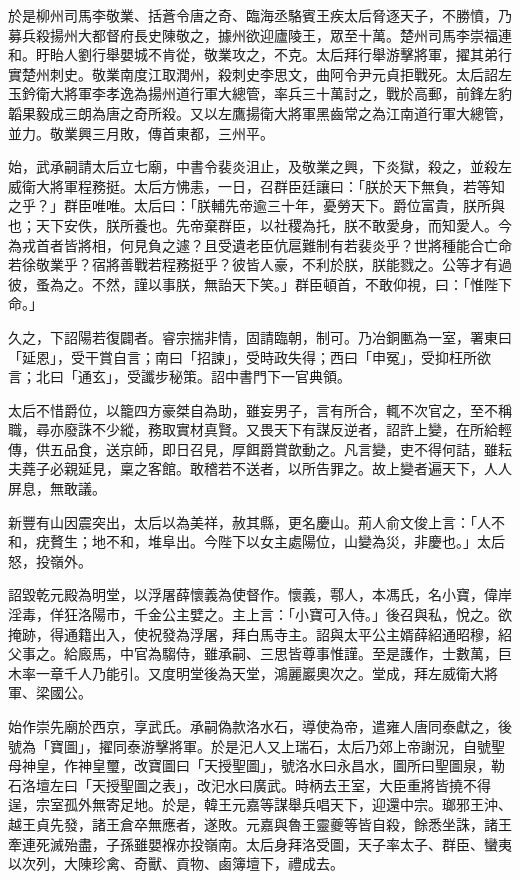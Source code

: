\begin{pinyinscope}
 於是柳州司馬李敬業、括蒼令唐之奇、臨海丞駱賓王疾太后脅逐天子，不勝憤，乃募兵殺揚州大都督府長史陳敬之，據州欲迎廬陵王，眾至十萬。楚州司馬李崇福連和。盱眙人劉行舉嬰城不肯從，敬業攻之，不克。太后拜行舉游擊將軍，擢其弟行實楚州刺史。敬業南度江取潤州，殺刺史李思文，曲阿令尹元貞拒戰死。太后詔左玉鈐衛大將軍李孝逸為揚州道行軍大總管，率兵三十萬討之，戰於高郵，前鋒左豹韜果毅成三朗為唐之奇所殺。又以左鷹揚衛大將軍黑齒常之為江南道行軍大總管，並力。敬業興三月敗，傳首東都，三州平。



 始，武承嗣請太后立七廟，中書令裴炎沮止，及敬業之興，下炎獄，殺之，並殺左威衛大將軍程務挺。太后方怫恚，一日，召群臣廷讓曰：「朕於天下無負，若等知之乎？」群臣唯唯。太后曰：「朕輔先帝逾三十年，憂勞天下。爵位富貴，朕所與也；天下安佚，朕所養也。先帝棄群臣，以社稷為托，朕不敢愛身，而知愛人。今為戎首者皆將相，何見負之遽？且受遺老臣伉扈難制有若裴炎乎？世將種能合亡命若徐敬業乎？宿將善戰若程務挺乎？彼皆人豪，不利於朕，朕能戮之。公等才有過彼，蚤為之。不然，謹以事朕，無詒天下笑。」群臣頓首，不敢仰視，曰：「惟陛下命。」



 久之，下詔陽若復闢者。睿宗揣非情，固請臨朝，制可。乃冶銅匭為一室，署東曰「延恩」，受干賞自言；南曰「招諫」，受時政失得；西曰「申冤」，受抑枉所欲言；北曰「通玄」，受讖步秘策。詔中書門下一官典領。



 太后不惜爵位，以籠四方豪桀自為助，雖妄男子，言有所合，輒不次官之，至不稱職，尋亦廢誅不少縱，務取實材真賢。又畏天下有謀反逆者，詔許上變，在所給輕傳，供五品食，送京師，即日召見，厚餌爵賞歆動之。凡言變，吏不得何詰，雖耘夫蕘子必親延見，稟之客館。敢稽若不送者，以所告罪之。故上變者遍天下，人人屏息，無敢議。



 新豐有山因震突出，太后以為美祥，赦其縣，更名慶山。荊人俞文俊上言：「人不和，疣贅生；地不和，堆阜出。今陛下以女主處陽位，山變為災，非慶也。」太后怒，投嶺外。



 詔毀乾元殿為明堂，以浮屠薛懷義為使督作。懷義，鄠人，本馮氏，名小寶，偉岸淫毒，佯狂洛陽市，千金公主嬖之。主上言：「小寶可入侍。」後召與私，悅之。欲掩跡，得通籍出入，使祝發為浮屠，拜白馬寺主。詔與太平公主婿薛紹通昭穆，紹父事之。給廄馬，中官為騶侍，雖承嗣、三思皆尊事惟謹。至是護作，士數萬，巨木率一章千人乃能引。又度明堂後為天堂，鴻麗巖奧次之。堂成，拜左威衛大將軍、梁國公。



 始作崇先廟於西京，享武氏。承嗣偽款洛水石，導使為帝，遣雍人唐同泰獻之，後號為「寶圖」，擢同泰游擊將軍。於是汜人又上瑞石，太后乃郊上帝謝況，自號聖母神皇，作神皇璽，改寶圖曰「天授聖圖」，號洛水曰永昌水，圖所曰聖圖泉，勒石洛壇左曰「天授聖圖之表」，改汜水曰廣武。時柄去王室，大臣重將皆撓不得逞，宗室孤外無寄足地。於是，韓王元嘉等謀舉兵唱天下，迎還中宗。瑯邪王沖、越王貞先發，諸王倉卒無應者，遂敗。元嘉與魯王靈夔等皆自殺，餘悉坐誅，諸王牽連死滅殆盡，子孫雖嬰褓亦投嶺南。太后身拜洛受圖，天子率太子、群臣、蠻夷以次列，大陳珍禽、奇獸、貢物、鹵簿壇下，禮成去。




\end{pinyinscope}
